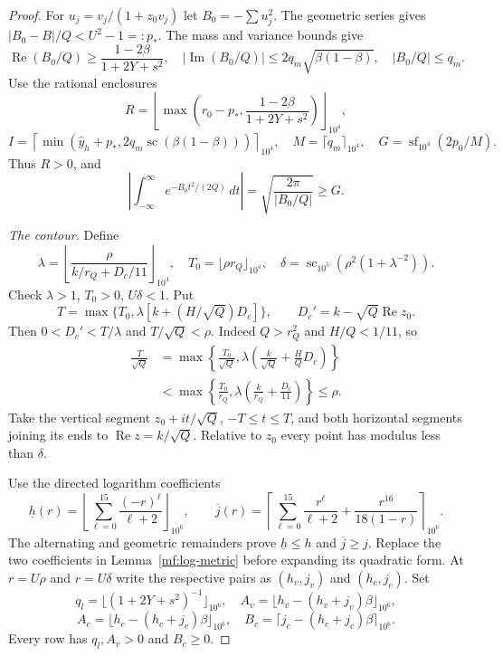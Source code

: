\documentclass[11pt,reqno]{amsart}
\numberwithin{equation}{section}
\theoremstyle{definition}
\theoremstyle{remark}
\renewcommand{\Re}{\operatorname{Re}}
\renewcommand{\Im}{\operatorname{Im}}
\begin{document}
\begin{proof}
For $u_j=v_j/(1+z_0v_j)$ let $B_0=-\sum u_j^2$.
The geometric series gives
$|B_0-B|/Q<U^2-1=:p_*$. The mass and variance bounds give
\[
 \Re(B_0/Q)\ge\frac{1-2\beta}{1+2Y+s^2},\quad
 |\Im(B_0/Q)|\le2q_m\sqrt{\beta(1-\beta)},\quad
 |B_0/Q|\le q_m.
\]
Use the rational enclosures
\[
 R=\left\lfloor\max\left(r_0-p_*,
             \frac{1-2\beta}{1+2Y+s^2}\right)\right\rfloor_{10^4},
\]
\[
 I=\left\lceil\min(\widehat y_h+p_*,
             2q_m\operatorname{sc}(\beta(1-\beta)))\right\rceil_{10^4},
 \quad M=\lceil q_m\rceil_{10^4},\quad
 G=\operatorname{sf}_{10^4}(2p_0/M).
\]
Thus $R>0$, and
\[
 \left|\int_{-\infty}^{\infty}e^{-B_0t^2/(2Q)}\,dt\right|
 =\sqrt{\frac{2\pi}{|B_0/Q|}}\ge G.
\]

\smallskip
\noindent\emph{The contour.}
Define
\[
 \lambda=\left\lfloor\frac{\rho}{k/r_Q+D_c/11}\right\rfloor_{10^4},
 \quad T_0=\lfloor\rho r_Q\rfloor_{10^4},\quad
 \delta=\operatorname{sc}_{10^5}(\rho^2(1+\lambda^{-2})).
\]
Check $\lambda>1$, $T_0>0$, $U\delta<1$. Put
\[
 T=\max\{T_0,\lambda[k+(H/\sqrt Q)D_c]\},\qquad
 D_c'=k-\sqrt Q\Re z_0.
\]
Then $0<D_c'<T/\lambda$ and $T/\sqrt Q<\rho$.
Indeed $Q>r_Q^2$ and $H/Q<1/11$, so
\begin{align*}
 \frac{T}{\sqrt Q}
 &=\max\left\{\frac{T_0}{\sqrt Q},
       \lambda\left(\frac{k}{\sqrt Q}+\frac{H}{Q}D_c\right)\right\}\\
 &<\max\left\{\frac{T_0}{r_Q},
       \lambda\left(\frac{k}{r_Q}+\frac{D_c}{11}\right)\right\}
 \le\rho.
\end{align*}
Take the vertical segment $z_0+it/\sqrt Q$, $-T\le t\le T$,
and both horizontal segments joining its ends to $\Re z=k/\sqrt Q$.
Relative to $z_0$ every point has modulus less than $\delta$.

Use the directed logarithm coefficients
\begin{equation}\label{mf:directed-log}
 \underline h(r)=\left\lfloor\sum_{\ell=0}^{15}
                      \frac{(-r)^\ell}{\ell+2}\right\rfloor_{10^6},
 \qquad
 \overline j(r)=\left\lceil\sum_{\ell=0}^{15}
          \frac{r^\ell}{\ell+2}+\frac{r^{16}}{18(1-r)}
                       \right\rceil_{10^6}.
\end{equation}
The alternating and geometric remainders prove
$\underline h\le h$ and $\overline j\ge j$.
Replace the two coefficients in Lemma~\ref{mf:log-metric}
before expanding its quadratic form. At $r=U\rho$ and
$r=U\delta$ write the respective pairs as $(h_v,j_v)$ and
$(h_c,j_c)$. Set
\[
 q_l=\lfloor(1+2Y+s^2)^{-1}\rfloor_{10^6},\quad
 A_v=\lfloor h_v-(h_v+j_v)\beta\rfloor_{10^6},
\]
\[
 A_c=\lfloor h_c-(h_c+j_c)\beta\rfloor_{10^6},\quad
 B_c=\lceil j_c-(h_c+j_c)\beta\rceil_{10^6}.
\]
Every row has $q_l,A_v>0$ and $B_c\ge0$.


\end{proof}
\end{document}
